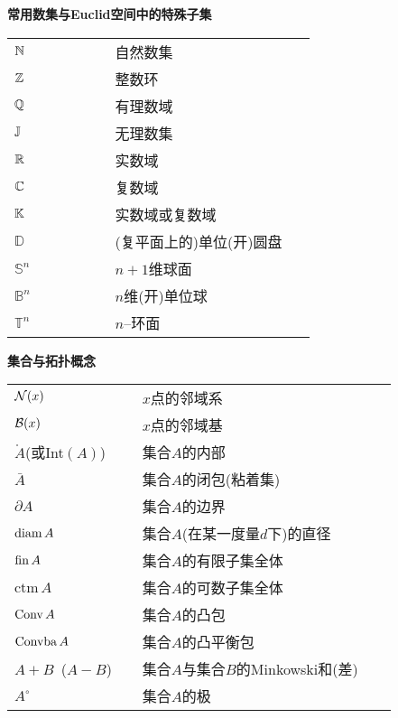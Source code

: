 \textbf{常用数集与Euclid空间中的特殊子集}
\vspace{1.5ex}

\begin{tabular}{p{0.3\linewidth}p{0.6\linewidth}}
	$\mathbb{N}$           & 自然数集                 \\
	$\mathbb{Z}$           & 整数环                   \\
	$\mathbb{Q}$           & 有理数域                 \\
	$\mathbb{J}$           & 无理数集                 \\
	$\mathbb{R}$           & 实数域                   \\
	$\mathbb{C}$           & 复数域                   \\
	$\mathbb{K}$           & 实数域或复数域           \\
	$\mathbb{D}$   & (复平面上的)单位(开)圆盘 \\
	$\mathbb{S}^n$ & $n+1$维球面              \\
	$\mathbb{B}^n$ & $n$维(开)单位球          \\
	$\mathbb{T}^n$ & $n$--环面                \\
\end{tabular}

\vspace{2.5ex}
\noindent\textbf{集合与拓扑概念}
\vspace{1.5ex}

\begin{tabular}{p{0.3\linewidth}p{0.6\linewidth}}
	$\mathcal{N}(x)$                   & $x$点的邻域系                     \\
	$\mathcal{B}(x)$                   & $x$点的邻域基                     \\
	$\mathring{A}$(或Int$(A)$) & 集合$A$的内部                     \\
	$\bar{A}$                  & 集合$A$的闭包(粘着集)             \\
	$\partial A$               & 集合$A$的边界                     \\
	$\operatorname{diam} A$                  & 集合$A$(在某一度量$d$下)的直径    \\
	$\operatorname{fin} A$                   & 集合$A$的有限子集全体             \\
	$\text{ctm}\, A$           & 集合$A$的可数子集全体             \\
	$\operatorname{Conv} A$                  & 集合$A$的凸包                     \\
	$\operatorname{Convba} A$                & 集合$A$的凸平衡包                 \\
	$A+B$\ ($A-B$)             & 集合$A$与集合$B$的Minkowski和(差) \\
	$A^\circ$                  & 集合$A$的极                       \\
\end{tabular}

